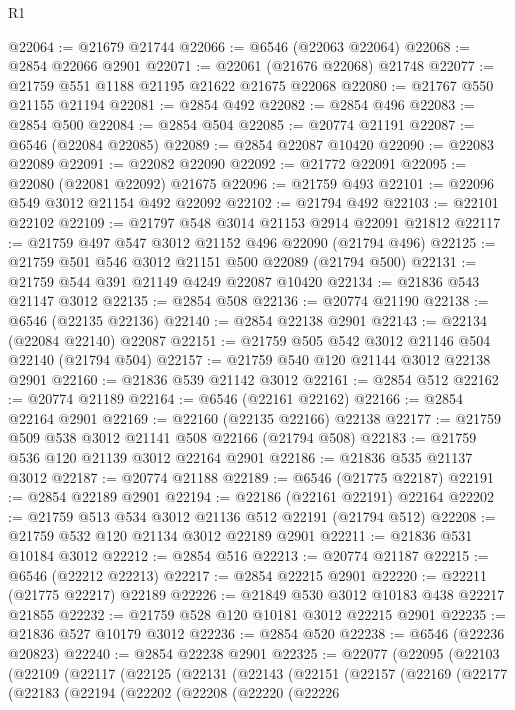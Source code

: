 \begin{lexlean}{R1}
\begin{coremodule}
@22064 := @21679 @21744
@22066 := @6546 (@22063 @22064)
@22068 := @2854 @22066 @2901
@22071 := @22061 (@21676 @22068) @21748
@22077 := @21759 @551 @1188 @21195 @21622 @21675 @22068
@22080 := @21767 @550 @21155 @21194
@22081 := @2854 @492
@22082 := @2854 @496
@22083 := @2854 @500
@22084 := @2854 @504
@22085 := @20774 @21191
@22087 := @6546 (@22084 @22085)
@22089 := @2854 @22087 @10420
@22090 := @22083 @22089
@22091 := @22082 @22090
@22092 := @21772 @22091
@22095 := @22080 (@22081 @22092) @21675
@22096 := @21759 @493
@22101 := @22096 @549 @3012 @21154 @492 @22092
@22102 := @21794 @492
@22103 := @22101 @22102
@22109 := @21797 @548 @3014 @21153 @2914 @22091 @21812
@22117 := @21759 @497 @547 @3012 @21152 @496 @22090 (@21794 @496)
@22125 := @21759 @501 @546 @3012 @21151 @500 @22089 (@21794 @500)
@22131 := @21759 @544 @391 @21149 @4249 @22087 @10420
@22134 := @21836 @543 @21147 @3012
@22135 := @2854 @508
@22136 := @20774 @21190
@22138 := @6546 (@22135 @22136)
@22140 := @2854 @22138 @2901
@22143 := @22134 (@22084 @22140) @22087
@22151 := @21759 @505 @542 @3012 @21146 @504 @22140 (@21794 @504)
@22157 := @21759 @540 @120 @21144 @3012 @22138 @2901
@22160 := @21836 @539 @21142 @3012
@22161 := @2854 @512
@22162 := @20774 @21189
@22164 := @6546 (@22161 @22162)
@22166 := @2854 @22164 @2901
@22169 := @22160 (@22135 @22166) @22138
@22177 := @21759 @509 @538 @3012 @21141 @508 @22166 (@21794 @508)
@22183 := @21759 @536 @120 @21139 @3012 @22164 @2901
@22186 := @21836 @535 @21137 @3012
@22187 := @20774 @21188
@22189 := @6546 (@21775 @22187)
@22191 := @2854 @22189 @2901
@22194 := @22186 (@22161 @22191) @22164
@22202 := @21759 @513 @534 @3012 @21136 @512 @22191 (@21794 @512)
@22208 := @21759 @532 @120 @21134 @3012 @22189 @2901
@22211 := @21836 @531 @10184 @3012
@22212 := @2854 @516
@22213 := @20774 @21187
@22215 := @6546 (@22212 @22213)
@22217 := @2854 @22215 @2901
@22220 := @22211 (@21775 @22217) @22189
@22226 := @21849 @530 @3012 @10183 @438 @22217 @21855
@22232 := @21759 @528 @120 @10181 @3012 @22215 @2901
@22235 := @21836 @527 @10179 @3012
@22236 := @2854 @520
@22238 := @6546 (@22236 @20823)
@22240 := @2854 @22238 @2901
@22325 := @22077
    (@22095
      (@22103
        (@22109
          (@22117
            (@22125
              (@22131
                (@22143
                  (@22151
                    (@22157
                      (@22169
                        (@22177
                          (@22183
                            (@22194
                              (@22202
                                (@22208
                                  (@22220
                                    (@22226

\end{coremodule}
\end{lexlean}
